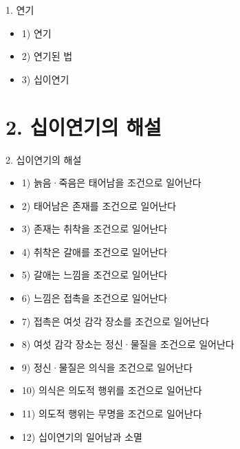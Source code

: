 \documentclass[aspectratio=1610,14pt,xcolor=pdftex,dvipsnames,table,handout]{beamer}
\begin{document}
		\begin{frame} [t,plain]
			\begin{block} {1. 연기}
			\begin{itemize}
				\item 1) 연기
				\item 2) 연기된 법
				\item 3) 십이연기
			\end{itemize}
			\end{block}
		\end{frame}

		\section{2. 십이연기의 해설}
		\frame [plain] {\sectionpage}

		\begin{frame} [t,plain]
			\begin{block} {2. 십이연기의 해설}
			\begin{itemize}
				\item 1) 늙음·죽음은 태어남을 조건으로 일어난다
				\item 2) 태어남은 존재를 조건으로 일어난다
				\item 3) 존재는 취착을 조건으로 일어난다
				\item 4) 취착은 갈애를 조건으로 일어난다
				\item 5) 갈애는 느낌을 조건으로 일어난다
				\item 6) 느낌은 접촉을 조건으로 일어난다
				\item 7) 접촉은 여섯 감각 장소를 조건으로 일어난다
				\item 8) 여섯 감각 장소는 정신·물질을 조건으로 일어난다
				\item 9) 정신·물질은 의식을 조건으로 일어난다
				\item 10) 의식은 의도적 행위를 조건으로 일어난다
				\item 11) 의도적 행위는 무명을 조건으로 일어난다
				\item 12) 십이연기의 일어남과 소멸
			\end{itemize}
			\end{block}
		\end{frame}

\end{document}
